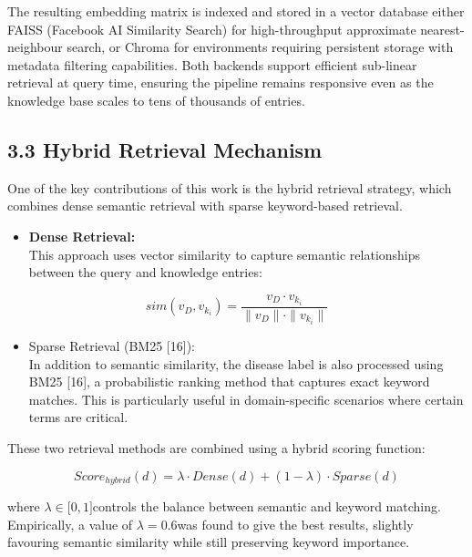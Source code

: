 The resulting embedding matrix is indexed and stored in a vector
database either FAISS (Facebook AI Similarity Search) for
high-throughput approximate nearest-neighbour search, or Chroma for
environments requiring persistent storage with metadata filtering
capabilities. Both backends support efficient sub-linear retrieval at
query time, ensuring the pipeline remains responsive even as the
knowledge base scales to tens of thousands of entries.

\subsection*{3.3 Hybrid Retrieval
Mechanism}\label{hybrid-retrieval-mechanism}

One of the key contributions of this work is the hybrid retrieval
strategy, which combines dense semantic retrieval with sparse
keyword-based retrieval.

\begin{itemize}
\item
  \textbf{Dense Retrieval:}\\
  This approach uses vector similarity to capture semantic relationships
  between the query and knowledge entries:
\end{itemize}

\[sim(v_{D},v_{k_{i}}) = \frac{v_{D} \cdot v_{k_{i}}}{\parallel v_{D} \parallel \cdot \parallel v_{k_{i}} \parallel}\]

\begin{itemize}
\item
  Sparse Retrieval (BM25 {[}16{]}):\\
  In addition to semantic similarity, the disease label is also
  processed using BM25 {[}16{]}, a probabilistic ranking method that
  captures exact keyword matches. This is particularly useful in
  domain-specific scenarios where certain terms are critical.
\end{itemize}

These two retrieval methods are combined using a hybrid scoring
function:

\[Score_{hybrid}(d) = \lambda \cdot Dense(d) + (1 - \lambda) \cdot Sparse(d)
\]

where \(\lambda \in \lbrack 0,1\rbrack\)controls the balance between
semantic and keyword matching. Empirically, a value of
\(\lambda = 0.6\)was found to give the best results, slightly favouring
semantic similarity while still preserving keyword importance.

